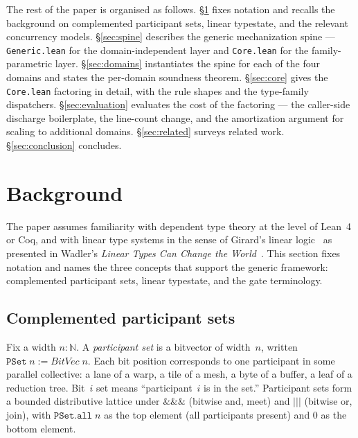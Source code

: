 \documentclass[acmsmall,screen,review,anonymous,nonacm]{acmart}
\newcommand{\PSet}{\texttt{PSet}}
\begin{document}
The rest of the paper is organised as follows. \S\ref{sec:background} fixes notation and recalls the background on complemented participant sets, linear typestate, and the relevant concurrency models. \S\ref{sec:spine} describes the generic mechanization spine --- \texttt{Generic.lean} for the domain-independent layer and \texttt{Core.lean} for the family-parametric layer. \S\ref{sec:domains} instantiates the spine for each of the four domains and states the per-domain soundness theorem. \S\ref{sec:core} gives the \texttt{Core.lean} factoring in detail, with the rule shapes and the type-family dispatchers. \S\ref{sec:evaluation} evaluates the cost of the factoring --- the caller-side discharge boilerplate, the line-count change, and the amortization argument for scaling to additional domains. \S\ref{sec:related} surveys related work. \S\ref{sec:conclusion} concludes.


\section{Background}\label{sec:background}

The paper assumes familiarity with dependent type theory at the level of Lean~4 or Coq, and with linear type systems in the sense of Girard's linear logic~\cite{girard:tcs:1987} as presented in Wadler's \emph{Linear Types Can Change the World}~\cite{wadler:ifip:1990}. This section fixes notation and names the three concepts that support the generic framework: complemented participant sets, linear typestate, and the gate terminology.

\subsection{Complemented participant sets}\label{sec:complemented-participant-sets}

Fix a width $n : \mathbb{N}$. A \emph{participant set} is a bitvector of width~$n$, written $\PSet\;n := \mathit{BitVec}\;n$. Each bit position corresponds to one participant in some parallel collective: a lane of a warp, a tile of a mesh, a byte of a buffer, a leaf of a reduction tree. Bit~$i$ set means ``participant~$i$ is in the set.'' Participant sets form a bounded distributive lattice under $\mathbin{\&\&\&}$ (bitwise and, meet) and $\mathbin{|||}$ (bitwise or, join), with $\texttt{PSet.all}\;n$ as the top element (all participants present) and $0$ as the bottom element.
\end{document}
